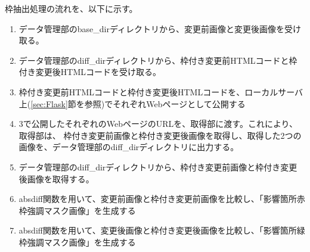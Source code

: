 \par
枠抽出処理の流れを、以下に示す。
\begin{enumerate}
    \item データ管理部のbase\_dirディレクトリから、変更前画像と変更後画像を受け取る。
    \item データ管理部のdiff\_dirディレクトリから、枠付き変更前HTMLコードと枠付き変更後HTMLコードを受け取る。
    \item 枠付き変更前HTMLコードと枠付き変更後HTMLコードを、ローカルサーバ上(\ref{sec:Flask}節を参照)でそれぞれWebページとして公開する
    \item 3で公開したそれぞれのWebページのURLを、取得部に渡す。これにより、取得部は、
          枠付き変更前画像と枠付き変更後画像を取得し、取得した2つの画像を、データ管理部のdiff\_dirディレクトリに出力する。
    \item データ管理部のdiff\_dirディレクトリから、枠付き変更前画像と枠付き変更後画像を取得する。
    \item absdiff関数を用いて、変更前画像と枠付き変更前画像を比較し、「影響箇所赤枠強調マスク画像」を生成する
    \item absdiff関数を用いて、変更後画像と枠付き変更後画像を比較し、「影響箇所緑枠強調マスク画像」を生成する
\end{enumerate}

